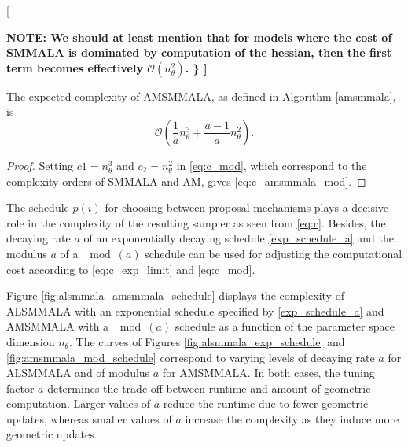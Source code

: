 \documentclass[twoside,11pt]{article}
\begin{document}
[{\bf NOTE: We should at least mention that for models where the cost of SMMALA is dominated by computation of the hessian, then the first term becomes effectively $\mathcal{O}(n_{\theta}^2)$. \} ]

\begin{lemma}
The expected complexity of AMSMMALA, as defined in Algorithm \ref{amsmmala}, is
\begin{equation}
\label{eq:c_amsmmala_mod}
\mathcal{O}\left(
\dfrac{1}{a}n_{\theta}^3+
\dfrac{a-1}{a}n_{\theta}^2
\right).
\end{equation}
\end{lemma}

\begin{proof}
Setting $c1=n_{\theta}^3$ and $c_2=n_{\theta}^2$ in \eqref{eq:c_mod}, which correspond to the complexity orders of SMMALA 
and AM, gives \eqref{eq:c_amsmmala_mod}.
\end{proof}

The schedule $p(i)$ for choosing between proposal mechanisms plays a decisive role in the complexity of the resulting sampler
as seen from \eqref{eq:c}. Besides, the decaying rate $a$ of an exponentially decaying schedule \eqref{exp_schedule_a} and 
the modulus $a$ of a $\mod{(a)}$ schedule can be used for adjusting the computational cost according to 
\eqref{eq:c_exp_limit} and \eqref{eq:c_mod}.

Figure \ref{fig:alsmmala_amsmmala_schedule} displays the complexity of ALSMMALA with an exponential schedule specified by
\eqref{exp_schedule_a} and AMSMMALA with a $\mod{(a)}$ schedule as a function of the parameter space dimension $n_{\theta}$.
The curves of Figures \ref{fig:alsmmala_exp_schedule} and \ref{fig:amsmmala_mod_schedule} correspond to varying levels of 
decaying rate $a$ for ALSMMALA and of modulus $a$ for AMSMMALA. In both cases, the tuning factor $a$ determines the 
trade-off between runtime and amount of geometric computation. Larger values of $a$ reduce the runtime due to fewer 
geometric updates, whereas smaller values of $a$ increase the complexity as they induce more geometric updates.

}
\end{document}

